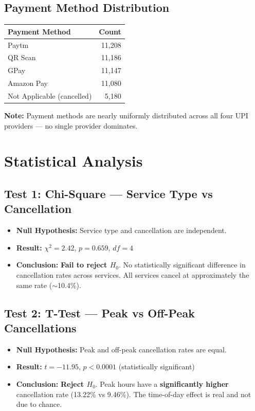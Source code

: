 \documentclass[12pt,a4paper]{article}
\begin{document}
\subsection{Payment Method Distribution}
\begin{center}
\begin{tabular}{lr}
\toprule
\textbf{Payment Method} & \textbf{Count} \\
\midrule
Paytm & 11,208 \\
QR Scan & 11,186 \\
GPay & 11,147 \\
Amazon Pay & 11,080 \\
Not Applicable (cancelled) & 5,180 \\
\bottomrule
\end{tabular}
\end{center}

\textbf{Note:} Payment methods are nearly uniformly distributed across all four UPI providers --- no single provider dominates.

\section{Statistical Analysis}

\subsection{Test 1: Chi-Square --- Service Type vs Cancellation}
\begin{itemize}
  \item \textbf{Null Hypothesis:} Service type and cancellation are independent.
  \item \textbf{Result:} $\chi^2 = 2.42$, $p = 0.659$, $df = 4$
  \item \textbf{Conclusion:} \textbf{Fail to reject $H_0$}. No statistically significant difference in cancellation rates across services. All services cancel at approximately the same rate ($\sim$10.4\%).
\end{itemize}

\subsection{Test 2: T-Test --- Peak vs Off-Peak Cancellations}
\begin{itemize}
  \item \textbf{Null Hypothesis:} Peak and off-peak cancellation rates are equal.
  \item \textbf{Result:} $t = -11.95$, $p < 0.0001$ (statistically significant)
  \item \textbf{Conclusion:} \textbf{Reject $H_0$}. Peak hours have a \textbf{significantly higher} cancellation rate (13.22\% vs 9.46\%). The time-of-day effect is real and not due to chance.
\end{itemize}
\end{document}
